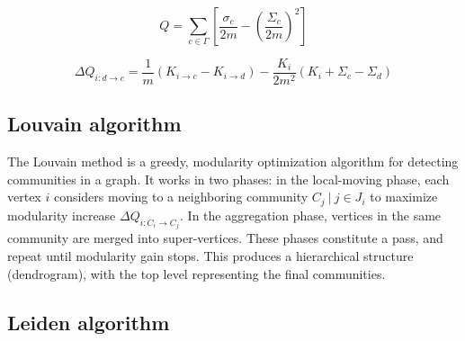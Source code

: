 \begin{equation}
\label{eq:modularity}
  Q
  = \sum_{c \in \Gamma} \left[\frac{\sigma_c}{2m} - \left(\frac{\Sigma_c}{2m}\right)^2\right]
\end{equation}

\begin{equation}
\label{eq:delta-modularity}
  \Delta Q_{i: d \rightarrow c}
  = \frac{1}{m} (K_{i \rightarrow c} - K_{i \rightarrow d}) - \frac{K_i}{2m^2} (K_i + \Sigma_c - \Sigma_d)
\end{equation}




\subsection{Louvain algorithm}
\label{sec:about-Louvain}

The Louvain method is a greedy, modularity optimization algorithm for detecting communities in a graph. It works in two phases: in the local-moving phase, each vertex $i$ considers moving to a neighboring community $C_j\ |\ j \in J_i$ to maximize modularity increase $\Delta Q_{i:C_i \rightarrow C_j}$. In the aggregation phase, vertices in the same community are merged into super-vertices. These phases constitute a pass, and repeat until modularity gain stops. This produces a hierarchical structure (dendrogram), with the top level representing the final communities.



\subsection{Leiden algorithm}
\label{sec:about-leiden}

